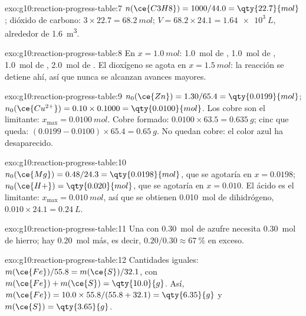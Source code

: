 \begin{solution}{exo:g10:reaction-progress-table:7}
$n(\ce{C3H8}) = 1000 / 44.0 = \qty{22.7}{mol}$; dióxido de carbono:
$3 \times 22.7 = \qty{68.2}{mol}$; $V = 68.2 \times 24.1 =
\qty{1.64e3}{L}$, alrededor de \qty{1.6}{m^3}.
\end{solution}

\begin{solution}{exo:g10:reaction-progress-table:8}
En $x = \qty{1.0}{mol}$: \qty{1.0}{mol} de , \qty{1.0}{mol} de
, \qty{1.0}{mol} de , \qty{2.0}{mol} de . El
dioxígeno se agota en $x = \qty{1.5}{mol}$: la reacción se detiene ahí,
así que nunca se alcanzan avances mayores.
\end{solution}

\begin{solution}{exo:g10:reaction-progress-table:9}
$n_0(\ce{Zn}) = 1.30 / 65.4 = \qty{0.0199}{mol}$;
$n_0(\ce{Cu^{2+}}) = 0.10 \times 0.1000 = \qty{0.0100}{mol}$. Los 
cobre son el limitante: $x_{\max} = \qty{0.0100}{mol}$. Cobre formado:
$0.0100 \times 63.5 = \qty{0.635}{g}$; cinc que queda:
$(0.0199 - 0.0100) \times 65.4 = \qty{0.65}{g}$. No quedan  cobre:
el color azul ha desaparecido.
\end{solution}

\begin{solution}{exo:g10:reaction-progress-table:10}
$n_0(\ce{Mg}) = 0.48 / 24.3 = \qty{0.0198}{mol}$, que se agotaría en
$x = 0.0198$; $n_0(\ce{H+}) = \qty{0.020}{mol}$, que se agotaría en
$x = 0.010$. El ácido es el limitante: $x_{\max} = \qty{0.010}{mol}$,
así que se obtienen \qty{0.010}{mol} de dihidrógeno,
$0.010 \times 24.1 = \qty{0.24}{L}$.
\end{solution}

\begin{solution}{exo:g10:reaction-progress-table:11}
Una  con \qty{0.30}{mol} de azufre necesita
\qty{0.30}{mol} de hierro; hay \qty{0.20}{mol} más, es decir,
$0.20 / 0.30 \approx \qty{67}{\percent}$ en exceso.
\end{solution}

\begin{solution}{exo:g10:reaction-progress-table:12}
Cantidades iguales: $m(\ce{Fe})/55.8 = m(\ce{S})/32.1$, con
$m(\ce{Fe}) + m(\ce{S}) = \qty{10.0}{g}$. Así,
$m(\ce{Fe}) = 10.0 \times 55.8 / (55.8 + 32.1) = \qty{6.35}{g}$ y
$m(\ce{S}) = \qty{3.65}{g}$.
\end{solution}

